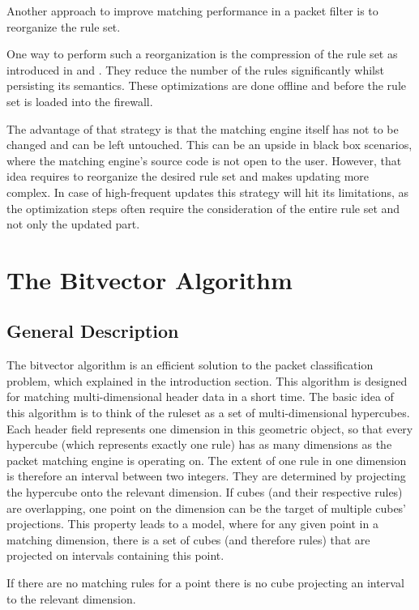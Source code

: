 \documentclass[a4paper,
		12pt,
		parskip=full,
		titlepage
		]{scrartcl}
\begin{document}
Another approach to improve matching performance in a packet filter is to reorganize the rule set.

One way to perform such a reorganization is the compression of the rule set as introduced in \cite{firewall_compressor} and \cite{redundancy_removal}.
They reduce the number of the rules significantly whilst persisting its semantics.
These optimizations are done offline and before the rule set is loaded into the firewall.

The advantage of that strategy is that the matching engine itself has not to be changed and can be left untouched.
This can be an upside in black box scenarios, where the matching engine's source code is not open to the user.
However, that idea requires to reorganize the desired rule set and makes updating more complex.
In case of high-frequent updates this strategy will hit its limitations, as the optimization steps often require the consideration of the entire rule set and not only the updated part.

\section{The Bitvector Algorithm}
\subsection{General Description}
The bitvector algorithm \cite{bv} is an efficient solution to the packet classification problem, which explained in the introduction section.
This algorithm is designed for matching multi-dimensional header data in a short time.
The basic idea of this algorithm is to think of the ruleset as a set of multi-dimensional hypercubes.
Each header field represents one dimension in this geometric object, so that every hypercube (which represents exactly one rule) has as many dimensions as the packet matching engine is operating on.
The extent of one rule in one dimension is therefore an interval between two integers.
They are determined by projecting the hypercube onto the relevant dimension.
If cubes (and their respective rules) are overlapping, one point on the dimension can be the target of multiple cubes' projections. 
This property leads to a model, where for any given point in a matching dimension, there is a set of cubes (and therefore rules) that are projected on intervals containing this point.

If there are no matching rules for a point there is no cube projecting an interval to the relevant dimension.
\end{document}
